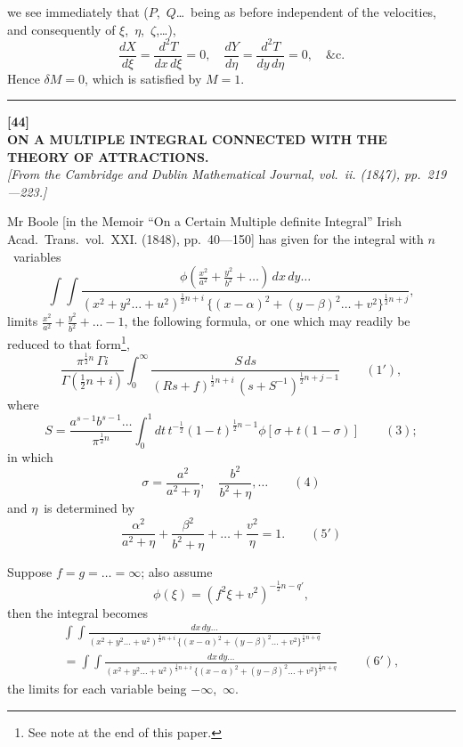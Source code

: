 \documentclass[11pt,a4paper]{book}
\begin{document}
we see immediately that ($P$,~$Q$\ldots\ being as before independent of the velocities, and consequently of $\xi$,~$\eta$,~$\zeta$,\ldots),
\[
\frac{dX}{d\xi} = \frac{d^2T}{dx\,d\xi} = 0, \quad \frac{dY}{d\eta} = \frac{d^2T}{dy\,d\eta} = 0, \quad \&\text{c.}
\]
Hence $\delta M = 0$, which is satisfied by $M = 1$.

\vspace{20pt}
\begin{center}
\rule{0.5\textwidth}{0.4pt}
\end{center}


\newpage
\begin{center}
\textbf{[44]}\\[4pt]
\textbf{\large ON A MULTIPLE INTEGRAL CONNECTED WITH THE\\THEORY OF ATTRACTIONS.}\\[4pt]
\textit{[From the Cambridge and Dublin Mathematical Journal, vol.~ii. (1847), pp.~219---223.]}
\end{center}

\vspace{6pt}

Mr Boole [in the Memoir ``On a Certain Multiple definite Integral'' Irish Acad.\ Trans.\ vol.~XXI. (1848), pp.~40---150] has given for the integral with $n$~variables
\[
\int\!\!\int \frac{\phi(\frac{x^2}{a^2} + \frac{y^2}{b^2} + \ldots)\,dx\,dy\ldots}{(x^2 + y^2\ldots + u^2)^{\frac{1}{2}n+i} \, \{(x-\alpha)^2 + (y-\beta)^2\ldots + v^2\}^{\frac{1}{2}n+j}},
\]
limits $\frac{x^2}{a^2} + \frac{y^2}{b^2} + \ldots - 1$,
the following formula, or one which may readily be reduced to that form\footnote{See note at the end of this paper.},
\[
\frac{\pi^{\frac{1}{2}n}\,\Gamma i}{\Gamma(\frac{1}{2}n+i)} \int_0^\infty \frac{S\,ds}{(Rs+f)^{\frac{1}{2}n+i} \,(s+S^{-1})^{\frac{1}{2}n+j-1}} \qquad(1'),
\]
where
\[
S = \frac{a^{s-1}b^{s-1}\ldots}{\pi^{\frac{1}{2}n}} \int_0^1 dt \, t^{-\frac{1}{2}}(1-t)^{\frac{1}{2}n-1} \phi[\sigma + t(1-\sigma)] \qquad(3);
\]
in which
\[
\sigma = \frac{a^2}{a^2+\eta}, \quad \frac{b^2}{b^2+\eta}, \ldots \qquad(4)
\]
and $\eta$~is determined by
\[
\frac{\alpha^2}{a^2+\eta} + \frac{\beta^2}{b^2+\eta} + \ldots + \frac{v^2}{\eta} = 1. \qquad(5')
\]

\vspace{10pt}

Suppose $f = g = \ldots = \infty$; also assume
\[
\phi(\xi) = (f^2\xi + v^2)^{-\frac{1}{2}n-q'},
\]
then the integral becomes
\begin{multline*}
\int\!\!\int \frac{dx\,dy\ldots}{(x^2+y^2\ldots+u^2)^{\frac{1}{2}n+i} \, \{(x-\alpha)^2 + (y-\beta)^2\ldots + v^2\}^{\frac{1}{2}n+q}} \\
= \int\!\!\int \frac{dx\,dy\ldots}{(x^2+y^2\ldots+u^2)^{\frac{1}{2}n+i} \, \{(x-\alpha)^2 + (y-\beta)^2\ldots + v^2\}^{\frac{1}{2}n+q}} \qquad(6'),
\end{multline*}
the limits for each variable being $-\infty$,~$\infty$.
\end{document}
